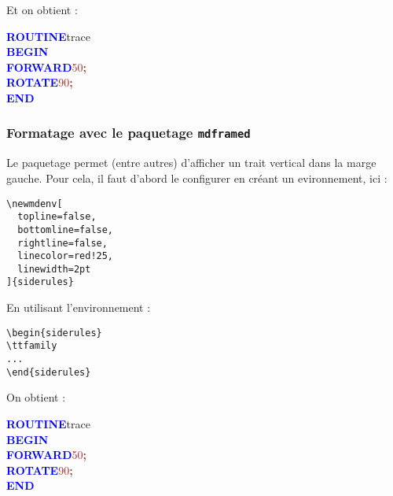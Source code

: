 Et on obtient :

\resetlinenumber
\begin{linenumbers}\linespread{1}\ttfamily
\textcolor{blue}{\bf ROUTINE}\hspace*{.6em}t{}r{}a{}c{}e{} \\
\textcolor{blue}{\bf BEGIN} \\
\hspace*{1.2em}\textcolor{blue}{\bf FORWARD}\hspace*{.6em}\textcolor{brown}{5{}0{}}\textcolor{brown}{\bf ;} \\
\hspace*{1.2em}\textcolor{blue}{\bf ROTATE}\hspace*{.6em}\textcolor{brown}{9{}0{}}\textcolor{brown}{\bf ;} \\
\textcolor{blue}{\bf END}
\end{linenumbers}

\subsubsection{Formatage avec le paquetage \texttt{mdframed}}

Le paquetage  permet (entre autres) d'afficher un trait vertical dans la marge gauche. Pour cela, il faut d'abord le configurer en créant un evironnement, ici  :

\begin{verbatim}
\newmdenv[
  topline=false,
  bottomline=false,
  rightline=false,
  linecolor=red!25,
  linewidth=2pt
]{siderules}
\end{verbatim}

En utilisant l'environnement  :

\begin{verbatim}
\begin{siderules}
\ttfamily
...
\end{siderules}
\end{verbatim}

On obtient :

{

\begin{siderulesRed}
\ttfamily
\textcolor{blue}{\bf ROUTINE}\hspace*{.6em}t{}r{}a{}c{}e{} \\
\textcolor{blue}{\bf BEGIN} \\
\hspace*{1.2em}\textcolor{blue}{\bf FORWARD}\hspace*{.6em}\textcolor{brown}{5{}0{}}\textcolor{brown}{\bf ;} \\
\hspace*{1.2em}\textcolor{blue}{\bf ROTATE}\hspace*{.6em}\textcolor{brown}{9{}0{}}\textcolor{brown}{\bf ;} \\
\textcolor{blue}{\bf END}
\end{siderulesRed}
}

